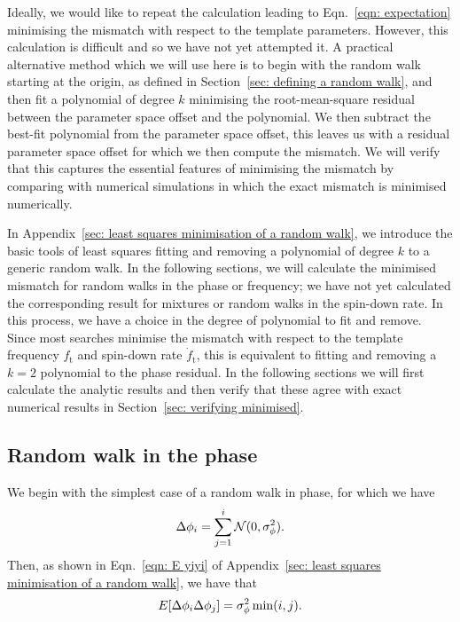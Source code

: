 \documentclass[../full_thesis/full_thesis.tex]{subfiles}
\begin{document}
Ideally, we would like to repeat the calculation leading to Eqn.~\eqref{eqn:
expectation} minimising the mismatch with respect to the template parameters.
However, this calculation is difficult and so we have not yet attempted it.  A
practical alternative method which we will use here is to begin with the random
walk starting at the origin, as defined in Section~\ref{sec: defining a random
walk}, and then fit a polynomial of degree $k$ minimising the root-mean-square
residual between the parameter space offset and the polynomial. We then
subtract the best-fit polynomial from the parameter space offset, this leaves
us with a residual parameter space offset for which we then compute the
mismatch. We will verify that this captures the essential features of
minimising the mismatch by comparing with numerical simulations in which the
exact mismatch is minimised numerically.

In Appendix~\ref{sec: least squares minimisation of a random walk}, we
introduce the basic tools of least squares fitting and removing a polynomial of
degree $k$ to a generic random walk. In the following sections, we will
calculate the minimised mismatch for random walks in the phase or frequency; we
have not yet calculated the corresponding result for mixtures or random walks
in the spin-down rate. In this process, we have a choice in the degree of
polynomial to fit and remove. Since most searches minimise the mismatch with
respect to the template frequency $f_\textrm{t}$ and spin-down rate
$\dot{f}_{\textrm{t}}$, this is equivalent to fitting and removing a $k=2$
polynomial to the phase residual. In the following sections we will first
calculate the analytic results and then verify that these agree with exact
numerical results in Section~\ref{sec: verifying minimised}.

\subsection{Random walk in the phase}
\label{sec: minimised rw in phase}
We begin with the simplest case of a random walk in phase, for which we have
\begin{equation}
\Delta\phi_{i} = \sum_{j=1}^{i}\mathcal{N}(0, \sigma_{\phi}^{2}).
\end{equation}
Then, as shown in Eqn.~\eqref{eqn: E yiyi} of Appendix~\ref{sec: least squares
minimisation of a random walk}, we have that
\begin{equation}
E[\Delta\phi_{i} \Delta\phi_{j}] = \sigma_{\phi}^{2} \min(i, j).
\end{equation}
\end{document}
